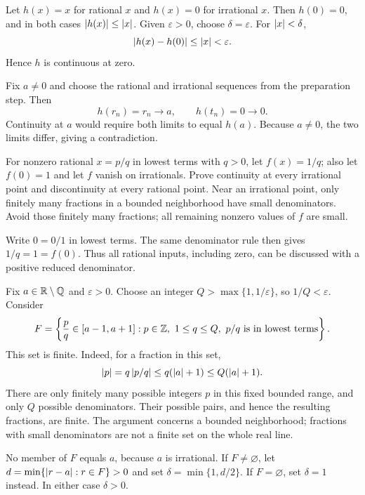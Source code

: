 Let $h(x)=x$ for rational $x$ and $h(x)=0$ for irrational $x$.
Then $h(0)=0$, and in both cases $\left|h(x)\right|\le\left|x\right|$.
Given $\varepsilon>0$, choose $\delta=\varepsilon$.
For $\left|x\right|<\delta$,
\[
 \left|h(x)-h(0)\right|\le\left|x\right|<\varepsilon.
\]
Hence $h$ is continuous at zero.

Fix $a\ne0$ and choose the rational and irrational sequences
from the preparation step. Then
\[
 h(r_n)=r_n\longrightarrow a,\qquad
 h(t_n)=0\longrightarrow0.
\]
Continuity at $a$ would require both limits to equal $h(a)$.
Because $a\ne0$, the two limits differ, giving a contradiction.

\goal For nonzero rational $x=p/q$ in lowest terms with $q>0$,
let $f(x)=1/q$; also let $f(0)=1$ and let $f$ vanish on
irrationals. Prove continuity at every irrational point and
discontinuity at every rational point.
\idea Near an irrational point, only finitely many fractions
in a bounded neighborhood have small denominators. Avoid those
finitely many fractions; all remaining nonzero values of $f$
are small.

Write $0=0/1$ in lowest terms. The same denominator rule
then gives $1/q=1=f(0)$. Thus all rational inputs, including
zero, can be discussed with a positive reduced denominator.

Fix $a\in\mathbb{R}\setminus\mathbb{Q}$ and $\varepsilon>0$.
Choose an integer $Q>\max\{1,1/\varepsilon\}$, so
$1/Q<\varepsilon$. Consider
\[
 F=\left\{\frac pq\in[a-1,a+1]:
 p\in\mathbb{Z},\ 1\le q\le Q,\ p/q\text{ is in lowest terms}\right\}.
\]
This set is finite. Indeed, for a fraction in this set,
\[
 \left|p\right|=q\left|p/q\right|\le q(\left|a\right|+1)\le Q(\left|a\right|+1).
\]
There are only finitely many possible integers $p$ in this
fixed bounded range, and only $Q$ possible denominators.
Their possible pairs, and hence the resulting fractions, are finite.
The argument concerns a bounded neighborhood; fractions with
small denominators are not a finite set on the whole real line.

No member of $F$ equals $a$, because $a$ is irrational.
If $F\ne\varnothing$, let
$d=\min\{\left|r-a\right|:r\in F\}>0$ and set
$\delta=\min\{1,d/2\}$. If $F=\varnothing$, set
$\delta=1$ instead. In either case $\delta>0$.


